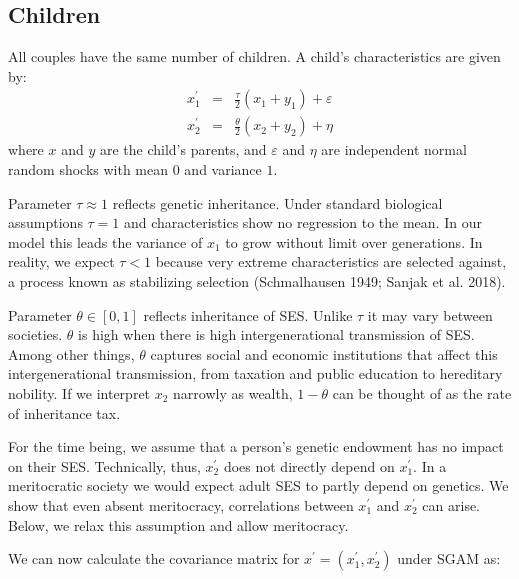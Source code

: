 \documentclass[
  12pt,
]{article}
\theoremstyle{definition}
\theoremstyle{definition}
\theoremstyle{definition}
\theoremstyle{definition}
\theoremstyle{remark}
\begin{document}
\subsection{Children}\label{children}

All couples have the same number of children. A child's characteristics are
given by:
\begin{eqnarray}
x_{1}^{\prime } &=&\frac{\tau }{2}\left( x_{1}+y_{1}\right) +\varepsilon
\label{Chil} \\
x_{2}^{\prime } &=&\frac{\theta }{2}\left( x_{2}+y_{2}\right) +\eta 
\nonumber
\end{eqnarray}
where \(x\) and \(y\) are the child's parents, and \(\varepsilon\) and \(\eta\) are
independent normal random shocks with mean \(0\) and variance \(1\).

Parameter \(\tau \approx 1\) reflects genetic inheritance. Under standard biological
assumptions \(\tau = 1\) and characteristics show no regression to the mean. In our
model this leads the variance of \(x_1\) to grow without limit over generations.
In reality, we expect \(\tau < 1\) because very extreme characteristics are
selected against, a process known as stabilizing selection
(Schmalhausen 1949; Sanjak et al. 2018).

Parameter \(\theta \in [0, 1]\) reflects inheritance of SES. Unlike \(\tau\) it may vary
between societies. \(\theta\) is high when there is high intergenerational
transmission of SES. Among other things, \(\theta\) captures social and economic
institutions
that affect this intergenerational transmission, from taxation and
public education to hereditary nobility. If we interpret \(x_2\) narrowly as
wealth, \(1 - \theta\) can be thought of as the rate of inheritance tax.

For the time being, we assume that a person's genetic endowment has no impact on
their SES. Technically, thus, \(x_{2}^\prime\) does not directly depend on
\(x_{1}^\prime\). In a meritocratic society we would expect adult SES to partly depend
on genetics. We show that even absent meritocracy, correlations between \(x_1^\prime\) and
\(x_{2}^\prime\) can arise. Below, we relax this assumption and allow meritocracy.

We can now calculate the covariance matrix for
\(x^\prime = (x_{1}^{\prime }, x_{2}^{\prime })\) under SGAM as:
\end{document}
